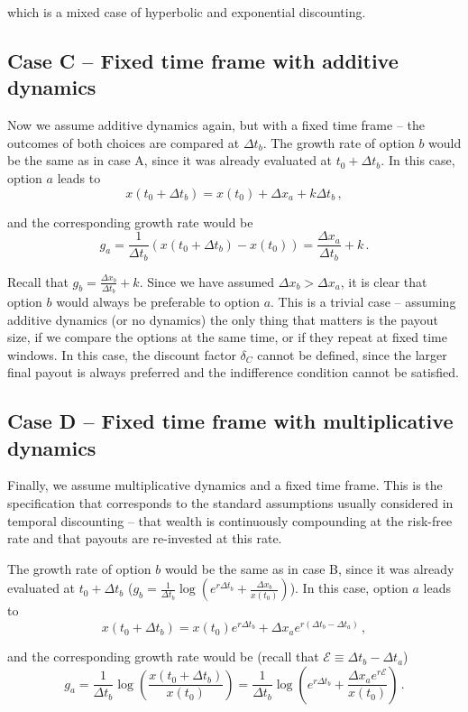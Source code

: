 \documentclass[11pt]{article}
\newcommand{\be}{\begin{equation}}
\newcommand{\ee}{\end{equation}}
\newcommand{\Dt}{\Delta t}
\newcommand{\Dx}{\Delta x}
\newcommand{\Epsilon}{\mathcal{E}}
\numberwithin{equation}{section}
\begin{document}
which is a mixed case of hyperbolic and exponential discounting.

\subsection{Case C -- Fixed time frame with additive dynamics}\label{sec:case_C}

Now we assume additive dynamics again, but with a fixed time frame -- the outcomes of both choices are compared at $\Dt_b$. The growth rate of option $b$ would be the same as in case A, since it was already evaluated at $t_0+\Dt_b$. In this case, option $a$ leads to
\be
x\left(t_0+\Dt_b\right) = x\left(t_0\right) + \Dx_a + k \Dt_b\,,
\ee

and the corresponding growth rate would be
\be
g_a = \frac{1}{\Dt_b}\left(x\left(t_0+\Dt_b\right) - x\left(t_0\right)\right) = \frac{\Dx_a}{\Dt_b} + k\,.
\ee

Recall that $g_b = \frac{\Dx_b}{\Dt_b} + k$. Since we have assumed $\Dx_b > \Dx_a$, it is clear that option $b$ would always be preferable to option $a$. This is a trivial case -- assuming additive dynamics (or no dynamics) the only thing that matters is the payout size, if we compare the options at the same time, or if they repeat at fixed time windows. In this case, the discount factor $\delta_C$ cannot be defined, since the larger final payout is always preferred and the indifference condition cannot be satisfied.

\subsection{Case D -- Fixed time frame with multiplicative dynamics}\label{sec:case_D}

Finally, we assume multiplicative dynamics and a fixed time frame. This is the specification that corresponds to the standard assumptions usually considered in temporal discounting -- that wealth is continuously compounding at the risk-free rate and that payouts are re-invested at this rate.

The growth rate of option $b$ would be the same as in case B, since it was already evaluated at $t_0+\Dt_b$ ($g_b = \frac{1}{\Dt_b}\log{\left(e^{r \Dt_b} + \frac{\Dx_b}{x\left(t_0\right)}\right)}$). In this case, option $a$ leads to
\be
x\left(t_0+\Dt_b\right) = x\left(t_0\right) e^{r \Dt_b} + \Dx_a e^{r \left(\Dt_b - \Dt_a\right)}\,,
\ee

and the corresponding growth rate would be (recall that $\Epsilon \equiv \Dt_b - \Dt_a$)
\be
g_a = \frac{1}{\Dt_b} \log{\left(\frac{x\left(t_0+\Dt_b\right)}{x\left(t_0\right)}\right)} = \frac{1}{\Dt_b}\log{\left(e^{r \Dt_b} + \frac{\Dx_a e^{r \Epsilon}}{x\left(t_0\right)}\right)}\,.
\ee
\end{document}
